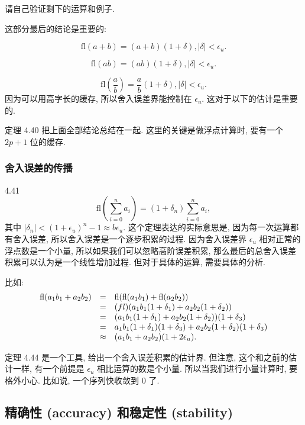 \documentclass[a4paper]{ctexart}
\begin{document}
{请自己验证剩下的运算和例子.

这部分最后的结论是重要的:

$$
\mbox{fl}(a + b) = (a + b)(1 + \delta), |\delta| < \epsilon_u.
$$

$$
\mbox{fl}(ab) = (ab)(1 + \delta), |\delta| < \epsilon_u.
$$

$$
\mbox{fl}(\frac{a}{b}) = \frac{a}{b}(1 + \delta), |\delta| < \epsilon_u.
$$
因为可以用高字长的缓存, 所以舍入误差界能控制在 $\epsilon_u$.
这对于以下的估计是重要的. 

定理 4.40 把上面全部结论总结在一起. 这里的关键是做浮点计算时,
要有一个 $2p + 1$ 位的缓存.

\subsubsection{舍入误差的传播}

 4.41
$$
\mbox{fl}\left(\sum_{i = 0}^n a_i\right) = (1 + \delta_n)\sum_{i = 0}^n a_i,
$$
其中 $|\delta_n| < (1 + \epsilon_u)^n - 1 \approx b \epsilon_u$.
这个定理表达的实际意思是, 因为每一次运算都有舍入误差, 所以舍入误差是一个逐步积累的过程.
因为舍入误差界 $\epsilon_u$ 相对正常的浮点数是一个小量, 所以如果我们可以忽略高阶误差积累,
那么最后的总舍入误差积累可以认为是一个线性增加过程. 但对于具体的运算, 需要具体的分析.

比如:
$$
\begin{array}{rcl}
  \mbox{fl}(a_1b_1 + a_2b_2) &=& \mbox{fl}(\mbox{fl}(a_1b_1) + \mbox{fl}(a_2b_2)) \\
  &=&\mbox(fl)(a_1b_1(1 + \delta_1) + a_2b_2(1 + \delta_2))\\
  &=&(a_1b_1(1+ \delta_1) + a_2b_2(1 + \delta_2))(1 + \delta_3) \\
  &=&a_1b_1(1 + \delta_1)(1 + \delta_3) + a_2b_2(1 + \delta_2)(1 + \delta_3)\\
  &\approx&(a_1b_1 + a_2b_2)(1 + 2\epsilon_u).
\end{array}
$$

定理 4.44 是一个工具, 给出一个舍入误差积累的估计界. 但注意, 这个和之前的估计一样,
有一个前提是 $\epsilon_u$ 相比运算的数是个小量. 所以当我们进行小量计算时, 要格外小心.
比如说, 一个序列快收敛到 $0$ 了.

\subsection{精确性 (accuracy) 和稳定性 (stability)}

}
\end{document}
